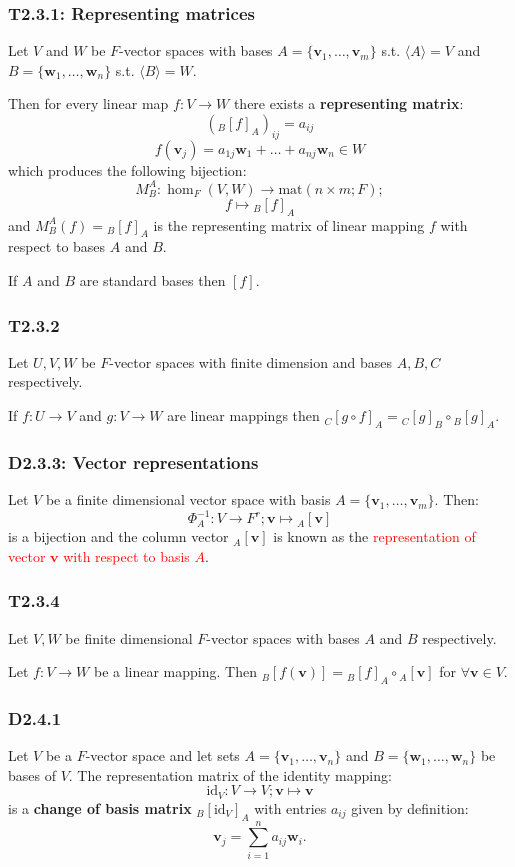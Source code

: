 \documentclass{article}
\newcommand{\vc}[1]{\boldsymbol{#1}}
\begin{document}
\begin{multicols*}{3}
\subsubsection*{T2.3.1: Representing matrices}
Let $V$ and $W$ be $F$-vector spaces
with bases $A=\{\vc{v}_1,\dots,\vc{v}_m\}$
s.t. $\langle A\rangle=V$
and $B=\{\vc{w}_1,\dots,\vc{w}_n\}$
s.t. $\langle B\rangle=W$.

Then for every linear map $f:V\rightarrow W$
there exists a \textbf{representing matrix}:
$$({}_{B}[f]_A)_{ij}=a_{ij}$$
$$f(\vc{v}_j)=a_{1j}\vc{w}_1+\dots+a_{nj}\vc{w}_n\in W$$
which produces the following bijection:
$$M_B^A:\hom_F(V,W)\rightarrow\text{mat}(n\times m;F);$$
$$f\mapsto{}_B[f]_A$$
and $M_B^A(f)={}_B[f]_A$ is the representing matrix
of linear mapping $f$ 
with respect to bases $A$ and $B$.

If $A$ and $B$ are standard bases then $[f]$.

\subsubsection*{T2.3.2}
Let $U,V,W$ be $F$-vector spaces with finite dimension
and bases $A,B,C$ respectively.

If $f:U\rightarrow V$ and $g:V\rightarrow W$
are linear mappings then
${}_C[g\circ f]_A={}_C[g]_B\circ{}_B[g]_A$.

\subsubsection*{D2.3.3: Vector representations}
Let $V$ be a finite dimensional vector space
with basis $A=\{\vc{v}_1,\dots,\vc{v}_m\}$.
Then:
$$\Phi_A^{-1}:V\rightarrow F^r;
\vc{v}\mapsto{}_A[\vc{v}]$$
is a bijection and the column vector ${}_A[\vc{v}]$
is known as the \textcolor{red}{representation
of vector $\vc{v}$ with respect to basis $A$}.

\subsubsection*{T2.3.4}
Let $V,W$ be finite dimensional $F$-vector spaces
with bases $A$ and $B$ respectively.

Let $f:V\rightarrow W$ be a linear mapping.
Then ${}_B[f(\vc{v})]={}_B[f]_A\circ {}_A[\vc{v}]$
for $\forall\vc{v}\in V$.

\subsubsection*{D2.4.1}
Let $V$ be a $F$-vector space
and let sets
$A=\{\vc{v}_1,\dots,\vc{v}_n\}$
and $B=\{\vc{w}_1,\dots,\vc{w}_n\}$
be bases of $V$.
The representation matrix of the identity mapping:
$$\text{id}_V:V\rightarrow V;
\vc{v}\mapsto\vc{v}$$
is a \textbf{change of basis matrix}
${}_B[\text{id}_V]_A$ with entries $a_{ij}$
given by definition:
$$\vc{v}_j=\sum_{i=1}^{n}a_{ij}\vc{w}_i.$$


\end{multicols*}
\end{document}
